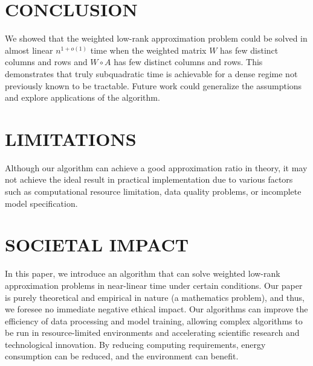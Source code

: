 \section{CONCLUSION}\label{sec:conclusion}

We showed that the weighted low-rank approximation problem could be solved in almost linear $n^{1+o(1)}$ time when the weighted matrix $W$ has few distinct columns and rows and $W \circ A$ has few distinct columns and rows. This demonstrates that truly subquadratic time is achievable for a dense regime not previously known to be tractable. 
Future work could generalize the assumptions and explore applications of the algorithm.

\section{LIMITATIONS}\label{sec:limitation}
Although our algorithm can achieve a good approximation ratio in theory, it may not achieve the ideal result in practical implementation due to various factors such as computational resource limitation, data quality problems, or incomplete model specification.

\section{SOCIETAL IMPACT}\label{sec:impact}
In this paper, we introduce an algorithm that can solve weighted low-rank approximation problems in near-linear time under certain conditions. Our paper is purely theoretical and empirical in nature (a mathematics problem), and thus, we foresee no immediate negative ethical impact. 
Our algorithms can improve the efficiency of data processing and model training, allowing complex algorithms to be run in resource-limited environments and accelerating scientific research and technological innovation. By reducing computing requirements, energy consumption can be reduced, and the environment can benefit.
